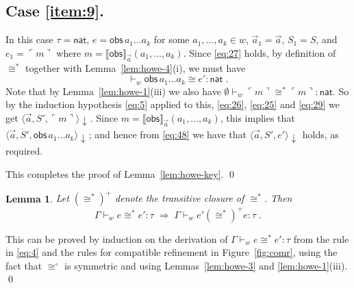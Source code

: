 \documentclass{LMCS}
\theoremstyle{plain}
\newtheorem{lemma}[thm]{Lemma}
\theoremstyle{definition}
\newcommand{\atm}[1][a]{#1}
\newcommand{\config}[3]{\langle#1, #2, #3\rangle}
\newcommand{\den}[1]{\llbracket#1\rrbracket}\newcommand{\DIVERGE}{\kw{diverge}}
\newcommand{\ent}{\vdash}
\renewcommand{\exp}[1][e]{#1}
\newcommand{\imp}{\Rightarrow}
\newcommand{\kw}[1]{\mathsf{#1}}
\newcommand{\NAT}{\kw{nat}}
\newcommand{\OBS}[1][obs]{\kw{#1}}
\newcommand{\ofty}{:}
\newcommand{\opeq}{\cong}
\newcommand{\opeqo}{\cong^{\circ}}
\newcommand{\rep}[1]{\ulcorner#1\urcorner}
\newcommand{\s}[1][a]{\vec{#1}}
\newcommand{\stk}[1][S]{#1}
\newcommand{\terminates}[1][]{{\downarrow_{#1}}}
\newcommand{\ty}{\tau}
\newcommand{\w}[1][w]{#1}
\begin{document}
  \subsection*{Case \ref{item:9}.} In this case $\ty=\NAT$,
  $\exp=\OBS\,\atm_1\ldots\atm_k$ for some
  $\atm_1,\ldots,\atm_k\in\w$, $\s_1=\s$, $\stk_1=\stk$, and
  $\exp_1=\rep{m}$ where $m=\den{\OBS}_{\s}(\atm_1,\ldots,\atm_k)$.
  Since \eqref{eq:27} holds, by definition of $\opeq^*$ together with
  Lemma~\ref{lem:howe-4}(i), we must have
  \begin{equation}
    \label{eq:48}
    {}\ent_{\w} \OBS\,\atm_1\ldots\atm_k \opeq e'\ofty \NAT\;.
  \end{equation}
  Note that by Lemma~\ref{lem:howe-1}(iii) we also have
  $\emptyset\ent_{\w}\rep{m}\opeq^*\rep{m}\ofty\NAT$. So by the
  induction hypothesis \eqref{eq:5} applied to this, \eqref{eq:26},
  \eqref{eq:25} and \eqref{eq:29} we get
  $\config{\s}{\stk'}{\rep{m}}\terminates$. Since
  $m=\den{\OBS}_{\s}(\atm_1,\ldots,\atm_k)$, this implies that
  $\config{\s}{\stk'}{\OBS\,\atm_1\ldots\atm_k}\terminates$; and
  hence from \eqref{eq:48} we have that
  $\config{\s}{\stk'}{\exp'}\terminates$ holds, as required.

  \bigskip\noindent
  This completes the proof of Lemma~\ref{lem:howe-key}.
\qed

\begin{lemma}
  \label{lem:howe-5}
  Let $(\opeq^*)^{+}$ denote the transitive closure of $\opeq^*$.
  Then 
  \[
  \Gamma\ent_{\w}\exp\opeq^*\exp'\ofty\ty \;\imp\;
  \Gamma\ent_{\w}\exp' \mathrel{(\opeq^*)^{+}} \exp\ofty\ty\;.
  \]
\end{lemma}
\proof
  This can be proved by induction on the derivation of
  $\Gamma\ent_{\w}\exp\opeq^*\exp'\ofty\ty$ from the rule in
  \eqref{eq:4} and the rules for compatible refinement in
  Figure~\ref{fig:comr}, using the fact that $\opeqo$ is symmetric and
  using Lemmas~\ref{lem:howe-3} and \ref{lem:howe-1}(iii).
\qed
\end{document}
